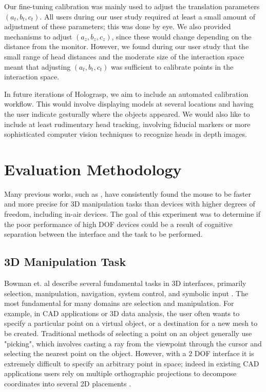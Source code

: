 \documentclass[pageno]{jpaper}
\begin{document}
Our fine-tuning calibration was mainly used to adjust the translation parameters $(a_t, b_t, c_t)$. All users during our user study required at least
a small amount of adjustment of these parameters; this was done by eye. We also provided mechanisms to adjust
$(a_z, b_z, c_z)$, since these would change depending on the distance from the monitor. However, we found during our user study that the small range of
head distances and the moderate size of the interaction space meant that adjusting $(a_t, b _t, c_t)$ was sufficient to calibrate points in the
interaction space.

In future iterations of Holograsp, we aim to include an automated calibration workflow. This would involve displaying models at several locations and
having the user indicate gesturally where the objects appeared. We would also like to include at least rudimentary head tracking, involving fiducial
markers or more sophisticated computer vision techniques to recognize heads in depth images.

\section{Evaluation Methodology}
Many previous works, such as \cite{study1,mattheiss2011navigating,study2}, have consistently found the
mouse to be faster and more precise for 3D manipulation
tasks than devices with higher degrees of freedom, including in-air devices.
The goal of this experiment was to determine if the poor performance of high DOF devices could
be a result of cognitive separation between the interface and the task to be performed.
\subsection{3D Manipulation Task}
Bowman et. al describe several fundamental tasks in 3D interfaces, primarily selection,
manipulation, navigation, system control, and symbolic input \cite{3dui}. The most fundamental
for many domains are selection and manipulation. For example, in CAD applications or 3D data
analysis, the user often wants to specify a particular point on a virtual object, or a
destination for a new mesh to be created. Traditional methods of selecting a point on an
object generally use "picking", which involves casting a ray from the viewpoint through the
cursor and selecting the nearest point on the object\cite{study1}. However, with a 2 DOF
interface it is extremely difficult to specify an arbitrary point in space; indeed in existing
CAD applications users rely on multiple orthographic projections to decompose coordinates into
several 2D placements \cite{study2}.
\end{document}
